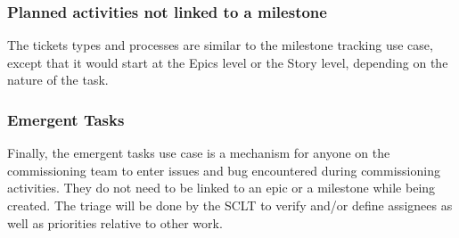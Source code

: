 \documentclass[SE,authoryear,toc]{lsstdoc}
\begin{document}
\subsubsection{Planned activities not linked to a milestone}
The tickets types and processes are similar to the milestone tracking use case, except that it would start at the Epics level or the Story level, depending on the nature of the task. 

\subsubsection{Emergent Tasks}
Finally, the emergent tasks use case is a mechanism for anyone on the commissioning team to enter issues and bug encountered during commissioning activities. 
They do not need to be linked to an epic or a milestone while being created. 
The triage will be done by the SCLT to verify and/or define assignees as well as priorities relative to other work. 
\end{document}
